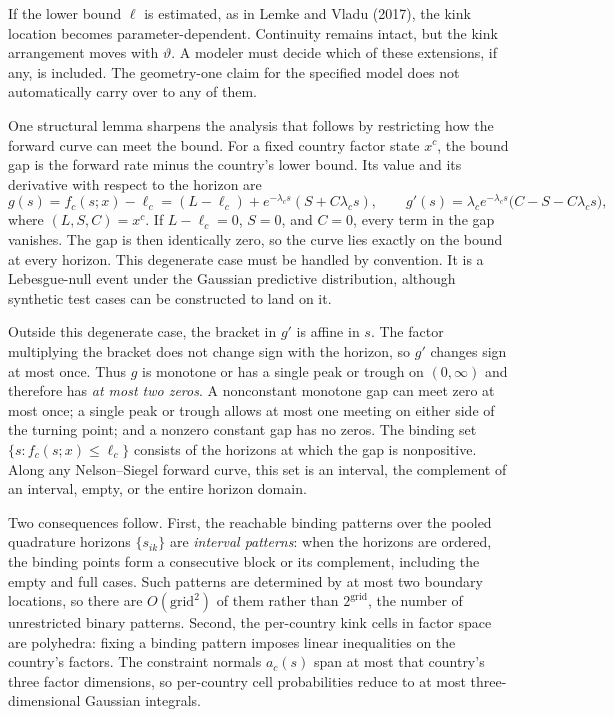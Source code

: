 \documentclass[11pt]{article}
\begin{document}
If the lower bound \(\ell\) is estimated, as in Lemke and Vladu (2017), the kink location becomes parameter-dependent. Continuity remains intact, but the kink arrangement moves with \(\vartheta\). A modeler must decide which of these extensions, if any, is included. The geometry-one claim for the specified model does not automatically carry over to any of them.

One structural lemma sharpens the analysis that follows by restricting how the forward curve can meet the bound. For a fixed country factor state \(x^c\), the bound gap is the forward rate minus the country's lower bound. Its value and its derivative with respect to the horizon are
\begin{equation}\label{eq:82}
 g(s)=f_c(s;x)-\ell_c=(L-\ell_c)+e^{-\lambda_c s}(S+C\lambda_c s),
 \qquad
 g'(s)=\lambda_c e^{-\lambda_c s}\bigl(C-S-C\lambda_c s\bigr),
\end{equation}
where \((L,S,C)=x^c\). If \(L-\ell_c=0\), \(S=0\), and \(C=0\), every term in the gap vanishes. The gap is then identically zero, so the curve lies exactly on the bound at every horizon. This degenerate case must be handled by convention. It is a Lebesgue-null event under the Gaussian predictive distribution, although synthetic test cases can be constructed to land on it.

Outside this degenerate case, the bracket in \(g'\) is affine in \(s\). The factor multiplying the bracket does not change sign with the horizon, so \(g'\) changes sign at most once. Thus \(g\) is monotone or has a single peak or trough on \((0,\infty)\) and therefore has \emph{at most two zeros}. A nonconstant monotone gap can meet zero at most once; a single peak or trough allows at most one meeting on either side of the turning point; and a nonzero constant gap has no zeros. The binding set \(\{s:f_c(s;x)\leq\ell_c\}\) consists of the horizons at which the gap is nonpositive. Along any Nelson--Siegel forward curve, this set is an interval, the complement of an interval, empty, or the entire horizon domain.

Two consequences follow. First, the reachable binding patterns over the pooled quadrature horizons \(\{s_{ik}\}\) are \emph{interval patterns}: when the horizons are ordered, the binding points form a consecutive block or its complement, including the empty and full cases. Such patterns are determined by at most two boundary locations, so there are \(O(\text{grid}^2)\) of them rather than \(2^{\text{grid}}\), the number of unrestricted binary patterns. Second, the per-country kink cells in factor space are polyhedra: fixing a binding pattern imposes linear inequalities on the country's factors. The constraint normals \(a_c(s)\) span at most that country's three factor dimensions, so per-country cell probabilities reduce to at most three-dimensional Gaussian integrals.
\end{document}
